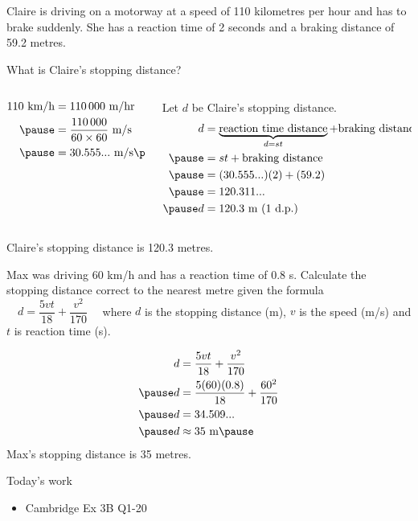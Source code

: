 \documentclass[aspectratio=169,10pt]{beamer}
\begin{document}
\begin{frame}
    \begin{example}
      Claire is driving on a motorway at a speed of 110 kilometres per hour and has to brake suddenly. She has a reaction time of 2 seconds and a braking distance of 59.2 metres.

      What is Claire's stopping distance?
    \end{example}\pause
    \begin{solution}[]\pause
    \begin{columns}[t]
    \begin{column}{.3\textwidth}
    \[
    \begin{aligned}
      110\text{ km/h}&=110\,000\text{ m/hr}\\\pause
      &=\frac{110\,000}{60\times60}\text{ m/s}\\\pause
      &=30.555...\text{ m/s}\pause
    \end{aligned}
    \]
    \end{column}
    \begin{column}{.6\textwidth}
    Let $d$ be Claire's stopping distance.\pause
    \[
    \begin{aligned}
      d&=\underbrace{\text{reaction time distance}}_{d=st}+\text{braking distance}\\\pause
      &=st+\text{braking distance}\\\pause
      &=(30.555...)(2)+(59.2)\\\pause
      &=120.311...\\\pause
      d&=120.3 \text{ m (1 d.p.)}
      \end{aligned}\pause
    \]
    \end{column}
    \end{columns}
    Claire's stopping distance is 120.3 metres.
    \end{solution}
\end{frame}

\begin{frame}
    \begin{example}
      Max was driving 60 km/h and has a reaction time of 0.8 s. Calculate the stopping distance correct to the nearest metre given the formula $\quad d=\dfrac{5vt}{18}+\dfrac{v^2}{170}\quad$ where $d$ is the stopping distance (m), $v$ is the speed (m/s) and $t$ is reaction time (s).
    \end{example}\pause
    \begin{solution}[]
    \[
    \begin{aligned}
      d&=\frac{5vt}{18}+\frac{v^2}{170}\\\pause
      d&=\frac{5(60)(0.8)}{18}+\frac{60^2}{170}\\\pause
      d&=34.509...\\\pause
      d&\approx35\text{ m}\pause
    \end{aligned}
    \]
    Max's stopping distance is 35 metres.
    \end{solution}
\end{frame}

\begin{frame}{Today's work}
  \begin{itemize} 
    \item Cambridge Ex 3B Q1-20
  \end{itemize}
\end{frame}
\end{document}
